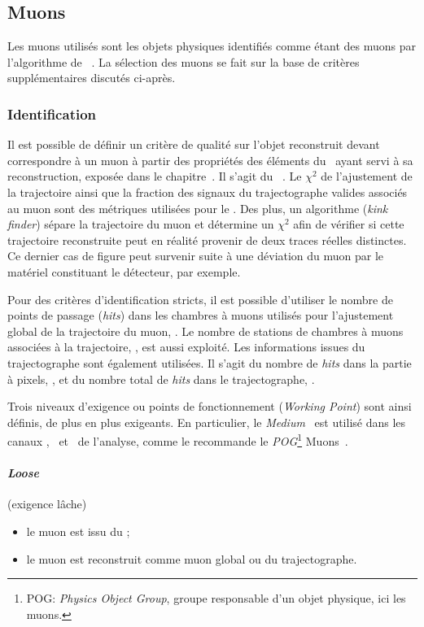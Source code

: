 \subsection{Muons}\label{chapter-HTT_analysis-section-objects-muons}
Les muons utilisés sont les objets physiques identifiés comme étant des muons par l'algorithme de \PF~\cite{particle-flow}.
La sélection des muons se fait sur la base de critères supplémentaires discutés ci-après.

\subsubsection{Identification}\label{chapter-HTT_analysis-section-objects-muons-ID}
Il est possible de définir un critère de qualité sur l'objet reconstruit devant correspondre à un muon à partir des propriétés des éléments du \PF\ ayant servi à sa reconstruction, exposée dans le chapitre~.
Il s'agit du \muonID~\cite{CMS-MUO-16-001,cmsMediumMuon}.
Le $\chi^2$ de l'ajustement de la trajectoire ainsi que la fraction des signaux du trajectographe valides associés au muon sont des métriques utilisées pour le \muonID.
Des plus, un algorithme (\emph{kink finder}) sépare la trajectoire du muon et détermine un $\chi^2$ afin de vérifier si cette trajectoire reconstruite peut en réalité provenir de deux traces réelles distinctes.
Ce dernier cas de figure peut survenir suite à une déviation du muon par le matériel constituant le détecteur, par exemple.
\par
Pour des critères d'identification stricts, il est possible d'utiliser le nombre de points de passage (\emph{hits}) dans les chambres à muons utilisés pour l'ajustement global de la trajectoire du muon, \Nmdhits.
Le nombre de stations de chambres à muons associées à la trajectoire, \Nms, est aussi exploité.
Les informations issues du trajectographe sont également utilisées.
Il s'agit du nombre de \emph{hits} dans la partie à pixels, \Npixelhits, et du nombre total de \emph{hits} dans le trajectographe, \Ntrkhits.
\par
Trois niveaux d'exigence ou points de fonctionnement (\emph{Working Point}) sont ainsi définis, de plus en plus exigeants.
En particulier, le \emph{Medium} \muonID\ est utilisé dans les canaux \mu\tauh, \ele\tauh\ et \ele\mu\ de l'analyse, comme le recommande le \emph{POG}\footnote{POG: \emph{Physics Object Group}, groupe responsable d'un objet physique, ici les muons.} Muons~\cite{cmsMediumMuon}.
\paragraph{\emph{Loose} \muonID} (exigence lâche)
\begin{itemize}
\item le muon est issu du \PF;
\item le muon est reconstruit comme muon global ou du trajectographe.
\end{itemize}
